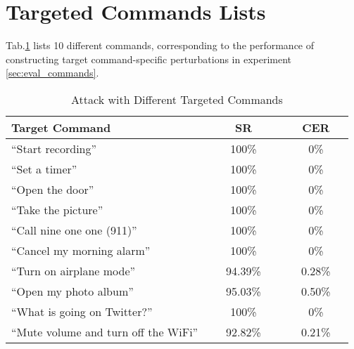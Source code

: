\section{Targeted Commands Lists}\label{append:command_list}
Tab.\ref{tab:diff_commands} lists 10 different commands, corresponding to the performance of constructing target command-specific perturbations in experiment \textsection\ref{sec:eval_commands}.
\begin{table}[h]
	\centering
        \normalsize
		\caption{Attack with Different Targeted Commands}
		\renewcommand\arraystretch{0.9}
		\renewcommand\tabcolsep{1.5pt}
		\begin{threeparttable}
			\begin{tabular}{l|c|c}
                \toprule
                \textbf{Target Command} & \textbf{~~~~SR~~~~} & \textbf{~~CER~~} \\
				\midrule
                    ``Start recording''  & 100\% & 0\% \\ \midrule
				``Set a timer''  & 100\%  & 0\% \\ \midrule
				``Open the door''  & 100\% & 0\% \\ \midrule
				``Take the picture''  & 100\% & 0\% \\ \midrule
				``Call nine one one (911)''  & 100\% & 0\% \\ \midrule
				``Cancel my morning alarm''  & 100\% & 0\% \\ \midrule
                    ``Turn on airplane mode'' & 94.39\% & 0.28\% \\ \midrule
                    ``Open my photo album''  & 95.03\% & 0.50\% \\ \midrule
				``What is going on Twitter?''  & 100\% & 0\% \\ \midrule
                    ``Mute volume and turn off the WiFi'' & 92.82\% & 0.21\% \\
				\bottomrule
			\end{tabular}
		\end{threeparttable}
		\label{tab:diff_commands}
\end{table}



